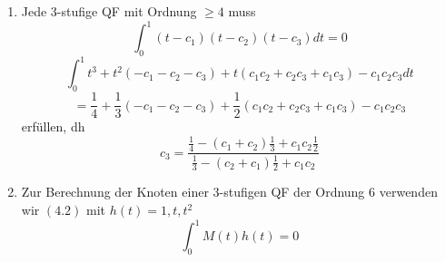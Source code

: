 \begin{nothing}
\begin{description} \item \end{description}
\begin{enumerate}
  \item Jede 3-stufige QF mit Ordnung $\geq 4$ muss
    $$\int_0^1 (t-c_1)(t-c_2)(t-c_3)dt = 0$$
    $$\int_0^1 t^3 + t^2(-c_1-c_2-c_3) + t(c_1c_2+c_2c_3+c_1c_3) - c_1c_2c_3 dt$$
    $$ = \frac{1}{4} + \frac{1}{3}(-c_1-c_2-c_3) + \frac{1}{2}(c_1c_2 + c_2c_3 + c_1c_3) - c_1c_2c_3$$
    erfüllen, dh
    $$ c_3 = \frac{\frac{1}{4} - (c_1+c_2)\frac{1}{3} + c_1c_2 \frac{1}{2}}{\frac{1}{3} - (c_2+c_1)\frac{1}{2} + c_1c_2}$$
    
  \item Zur Berechnung der Knoten einer $3$-stufigen QF der Ordnung $6$ verwenden wir $(4.2)$ mit $h(t) = 1, t, t^2$
    $$\int_0^1 M(t)h(t) = 0$$
\end{enumerate}
\end{nothing}
